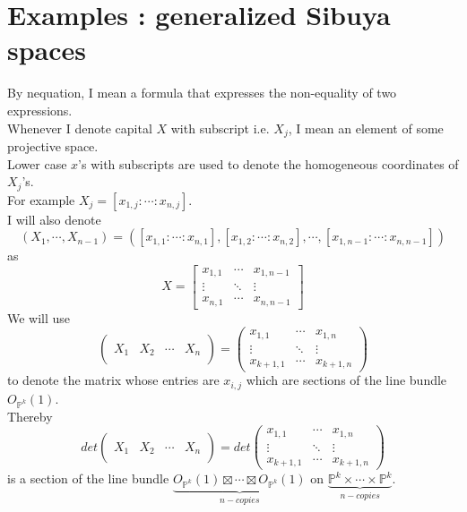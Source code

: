 \section{Examples : generalized Sibuya spaces}
By nequation, I mean a formula that expresses the non-equality of two expressions.\\
Whenever I denote capital $X$ with subscript i.e. $X_j$, I mean an element of some projective space.\\
Lower case $x$'s with subscripts are used to denote the homogeneous coordinates of $X_j$'s.\\
For example $X_j=[x_{1,j} : \cdots : x_{n,j}]$.\\
I will also denote
\[
	(X_1,\cdots,X_{n-1})=([x_{1,1}:\cdots:x_{n,1}],[x_{1,2}:				\cdots:x_{n,2}],
	\cdots,
	[x_{1,n-1}:\cdots:x_{n,n-1}])
\] as 
\[
	X
	=
	\begin{bmatrix}
		x_{1,1}&\cdots&x_{1,n-1}\\
		\vdots&\ddots&\vdots\\
		x_{n,1}&\cdots&x_{n,n-1}
	\end{bmatrix}
\]
We will use
\[
		\left( \begin{array}{c|c|c|c}
			& & & \\
			X_1&X_2&\cdots& X_{n}\\
			& & &
		\end{array}\right)
		=
		\left( \begin{array}{ccc}
			x_{1,1}&\cdots & x_{1,n} \\
			\vdots&\ddots & \vdots \\
			x_{k+1,1}&\cdots& x_{k+1,n}
		\end{array}\right)
\]
to denote the matrix whose entries are $x_{i,j}$ which are sections of the line bundle $O_{\mathbb{P}^k}(1)$.\\
Thereby
\[
det
		\left(\begin{array}{c|c|c|c}
			& & & \\
			X_1&X_2&\cdots& X_{n}\\
			& & &
		\end{array}\right)
		=
		det
		\left( \begin{array}{ccc}
			x_{1,1}&\cdots & x_{1,n} \\
			\vdots&\ddots & \vdots \\
			x_{k+1,1}&\cdots& x_{k+1,n}
		\end{array}\right)
\]
is a section of the line bundle $\underbrace{O_{\mathbb{P}^k}(1)\boxtimes\cdots \boxtimes O_{\mathbb{P}^k}(1)}_{n-copies}$ on $\underbrace{\mathbb{P}^k\times\cdots \times \mathbb{P}^k}_{n-copies}$.
